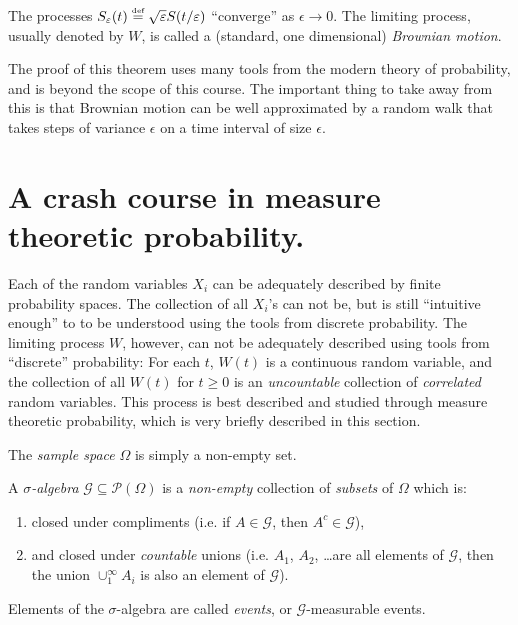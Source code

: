 \begin{theorem}
  The processes $S_\varepsilon(t) \stackrel{\scriptscriptstyle\textup{def}}{=} \sqrt{\varepsilon} S( t / \varepsilon )$ ``converge'' as $\epsilon \to 0$.
  The limiting process, usually denoted by $W$, is called a (standard, one dimensional) \emph{Brownian motion}.
\end{theorem}

The proof of this theorem uses many tools from the modern theory of probability, and is beyond the scope of this course.
The important thing to take away from this is that Brownian motion can be well approximated by a random walk that takes steps of variance $\epsilon$ on a time interval of size $\epsilon$.
 

\section{A crash course in measure theoretic probability.}

Each of the random variables $X_i$ can be adequately described by finite probability spaces.
The collection of all $X_i$'s can not be, but is still ``intuitive enough'' to to be understood using the tools from discrete probability.
The limiting process $W$, however, can not be adequately described using tools from ``discrete'' probability: For each $t$, $W(t)$ is a continuous random variable, and the collection of all $W(t)$ for $t \geq 0$ is an \emph{uncountable} collection of \emph{correlated} random variables.
This process is best described and studied through measure theoretic probability, which is very briefly described in this section.

\begin{definition}
  The \emph{sample space} $\Omega$ is simply a non-empty set.
\end{definition}

\begin{definition}
  A \emph{$\sigma$-algebra} $\mathcal G \subseteq \mathcal P(\Omega)$ is a \emph{non-empty} collection of \emph{subsets} of $\Omega$ which is:
  \begin{enumerate}
    \item closed under compliments (i.e. if $A \in \mathcal G$, then $A^c \in \mathcal G$),
    \item and closed under \emph{countable} unions (i.e. $A_1$, $A_2$, \dots are all elements of $\mathcal G$, then the union $\cup_1^\infty A_i$ is also an element of $\mathcal G$).
  \end{enumerate}
  Elements of the $\sigma$-algebra are called \emph{events}, or $\mathcal G$-measurable events.
\end{definition}

